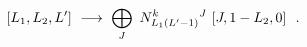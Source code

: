 \begin{equation}\label{mmADflowII}
[L_{1},L_{2},L']\ \longrightarrow\ \makebox[6cm][l]{$
\displaystyle \bigoplus_{J}\ N^{k}_{L_{1} (L'-1)}{}^{J}\ [J,1-L_{2},0] \ \ .$}
\end{equation}

